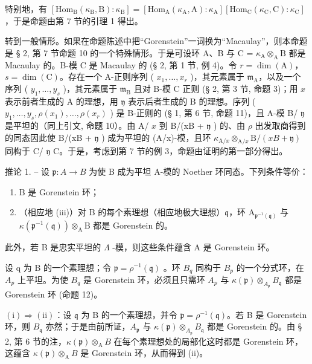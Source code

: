 特别地，有 \(\left[\mathrm{Hom}_{\mathrm{B}}(\kappa_{\mathrm{B}},\mathrm{B}):\kappa_{\mathrm{B}}\right] = \left[\mathrm{Hom}_{\mathrm{A}}(\kappa_{\mathrm{A}},\mathrm{A}):\kappa_{\mathrm{A}}\right]\left[\mathrm{Hom}_{\mathrm{C}}(\kappa_{\mathrm{C}},\mathrm{C}):\kappa_{\mathrm{C}}\right]\)，于是命题由第 7 节的引理 1 得出。

转到一般情形。如果在命题陈述中把“Gorenstein”一词换为“Macaulay”，则本命题是 § 2, 第 7 节命题 10 的一个特殊情形。于是可设环 A、B 与 C = \(\kappa_{\mathrm{A}} \otimes_{\mathrm{A}} \mathrm{B}\) 都是 Macaulay 的。B-模 C 是 Macaulay 的 (§ 2, 第 1 节, 例 4)。令 \(r = \dim(\mathrm{A})\)，\(s = \dim(\mathrm{C})\)。存在一个 A-正则序列 ( \(x_1, \ldots, x_r\) )，其元素属于 \(\mathfrak{m}_{\mathrm{A}}\)，以及一个序列 ( \(y_1, \ldots, y_s\) )，其元素属于 \(\mathfrak{m}_{\mathrm{B}}\) 且对 B-模 C 正则 (§ 2, 第 3 节, 命题 3)；用 \(x\) 表示前者生成的 A 的理想，用 \(\mathfrak{y}\) 表示后者生成的 B 的理想。序列 ( \(y_1, \ldots, y_s, \rho(x_1), \ldots, \rho(x_r)\) ) 是 B-正则的 (§ 1, 第 6 节, 命题 11)，且 A-模 B/ \(\mathfrak{y}\) 是平坦的（同上引文, 命题 10）。由 A/ \(x\) 到 B/(xB + \(\mathfrak{y}\) ) 的、由 \(\rho\) 出发取商得到的同态因此使 B/(xB + \(\mathfrak{y}\) ) 成为平坦的 (A/x)-模，且环 \(\kappa_{\mathrm{A}/x} \otimes_{\mathrm{A}/x} \mathrm{B}/(xB + \mathfrak{y})\) 同构于 C/ \(\mathfrak{y}\) C。于是，考虑到第 7 节的例 3，命题由证明的第一部分得出。

推论 1. -- 设 \(\mathfrak{p}: A \to B\) 为使 B 成为平坦 A-模的 Noether 环同态。下列条件等价：

\begin{enumerate}
\def\labelenumi{(\roman{enumi})}
\item
  B 是 Gorenstein 环；
\item
  （相应地 (iii)）对 B 的每个素理想（相应地极大理想）\(\mathfrak{q}\)，环 \(\mathrm{A}_{\mathfrak{p}^{-1}(\mathfrak{q})}\) 与 \(\kappa (\mathfrak{p}^{-1}(\mathfrak{q}))\otimes_{\mathrm{A}}\mathrm{B}\) 都是 Gorenstein 的。
\end{enumerate}

此外，若 B 是忠实平坦的 \(\Lambda\) -模，则这些条件蕴含 A 是 Gorenstein 环。

设 q 为 B 的一个素理想；令 \(\mathfrak{p} = \rho^{-1}(\mathfrak{q})\) 。环 \(B_{q}\) 同构于 \(B_{p}\) 的一个分式环，在 \(A_{p}\) 上平坦。为使 \(B_{q}\) 是 Gorenstein 环，必须且只需环 \(A_{p}\) 与 \(\kappa(\mathfrak{p}) \otimes_{A_{\mathfrak{p}}} B_{\mathfrak{q}}\) 都是 Gorenstein 环 (命题 12)。

\((\mathrm{i}) \Rightarrow (\mathrm{ii})\)：设 \(\mathfrak{q}\) 为 B 的一个素理想，并令 \(\mathfrak{p} = \rho^{-1}(\mathfrak{q})\)。若 B 是 Gorenstein 环，则 \(B_{\mathfrak{q}}\) 亦然；于是由前所证，\(A_{\mathfrak{p}}\) 与 \(\kappa(\mathfrak{p}) \otimes_{A_{\mathfrak{p}}} B_{\mathfrak{q}}\) 都是 Gorenstein 的。由 § 2, 第 6 节的注，\(\kappa(\mathfrak{p}) \otimes_{\mathrm{A}} B\) 在每个素理想处的局部化这时都是 Gorenstein 环，这蕴含 \(\kappa(\mathfrak{p}) \otimes_{\mathrm{A}} B\) 是 Gorenstein 环，从而得到 (ii)。

